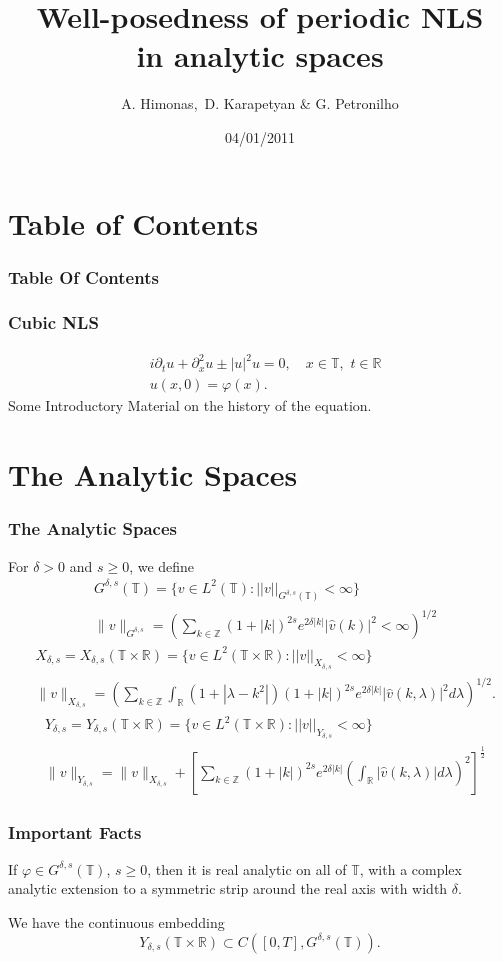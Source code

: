 \documentclass{beamer}
\date{04/01/2011}
\title
{ Well-posedness of  periodic NLS  \\in  analytic  spaces}
\author{{A.  Himonas,\, D. Karapetyan   \& G. Petronilho}}
\numberwithin{equation}{section}
\newcommand{\p}{\partial}
\newcommand{\ci}{\mathbb{T}}
\newcommand{\vp}{\varphi}
\begin{document}
\begin{frame}
\titlepage
\end{frame}


\section*{Table of Contents}
\begin{frame}
\frametitle{Table Of Contents}
\tableofcontents
\end{frame}
%
%
\begin{frame}
  \frametitle{Cubic NLS}
%
%
\begin{align*}
	&i \p_t u + \p_x^{2} u \pm
  |u|^2 u =0, \quad x\in \mathbb{T},\,\,t\in \mathbb{R}
		\\
		&u(x,0) = \vp(x).
\end{align*}
%
Some Introductory Material on the history of the equation.
\end{frame}
%
%
\section{The Analytic Spaces}
\begin{frame}
  \frametitle{The Analytic Spaces}
For $\delta >0$ and $s\ge 0$, we define 
\pause
%
%
\begin{align*}
 & G^{\delta,s}(\mathbb{T})=\{v\in L^2(\mathbb{T}):
 ||v||_{G^{\delta,s}(\mathbb{T})}< \infty \}
 \\
 & \| v \|_{G^{\delta,s}}
 =\left( \sum_{k\in \mathbb{Z}} 
 (1+ |k|)^{2s}e^{2\delta|k|}|\widehat{v}(k)|^2<\infty\right)^{1/2}
 \end{align*}
%
%
\pause
\begin{align*}
  & X_{\delta,s}=X_{\delta,s}(\mathbb{T}\times \mathbb{R})=\{v\in L^2(\mathbb{T}\times \mathbb{R}):
||v||_{X_{\delta,s}}<\infty\}
\\
& \| v \|_{X_{\delta,s}}
=\left( \sum_{k\in \mathbb{Z}}\int_{\mathbb{R}}(1+|\lambda
-k^2|)(1+|k|)^{2s}
e^{2\delta |k|}|\widehat{v}(k,\lambda)|^2d\lambda\right)^{1/2}.
\end{align*}
%
\pause
%
\begin{align*}
& Y_{\delta,s}=Y_{\delta,s}(\mathbb{T}\times \mathbb{R})=\{v\in L^2(\mathbb{T}\times \mathbb{R}):
||v||_{Y_{\delta,s}}<\infty\}
\\
& \| v \|_{Y_{\delta,s}}
= \|v \|_{X_{\delta,s}}
+\left [\sum_{k\in \mathbb{Z}}(1+|k|)^{2s}e^{2\delta |k|}
\left (\int_{\mathbb{R}}
|\widehat{v}(k,\lambda)|d\lambda \right)^2 \right]^{\frac{1}{2}} 
\end{align*}
%
\end{frame}
%
%
\begin{frame}
  \frametitle{Important Facts}
      \begin{lemma}
    If $\vp \in G^{\delta,s}(\ci)$, $s \ge 0$,
      then it is real analytic on all of $\ci$, with a complex
  analytic extension to a symmetric strip around the real axis with width $\delta$.
\end{lemma}
  \begin{lemma}We have the continuous embedding
$$Y_{\delta,s}(\mathbb{T}\times \mathbb{R})
\subset C([0,T],G^{\delta,s}(\mathbb{T})).$$
\end{lemma}
\end{frame}
%
%
\end{document}
